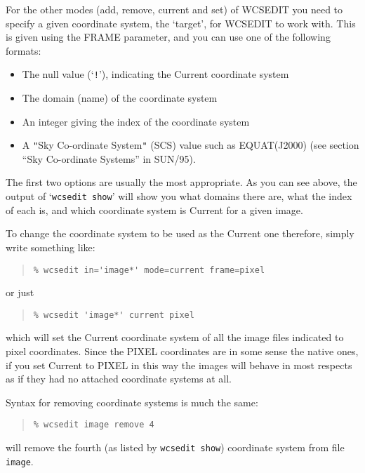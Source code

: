 \documentclass[twoside,11pt]{article}
\newcommand{\xref}[3]{#1}
\renewcommand{\_}{\texttt{\symbol{95}}}
\newenvironment{myquote}{\begin{quote}\begin{small}}{\end{small}\end{quote}}
\newcommand{\qt}[1]{{\tt "}#1{\tt "}}
\newcommand{\routine}[1]{{\sc #1}}
\begin{document}
For the other modes (add, remove, current and set) of \routine{WCSEDIT}
you need to specify a given coordinate system,
the `target', for \routine{WCSEDIT} to work with.
This is given using the FRAME parameter, and you can use one
of the following formats:
\begin{itemize}
\item
The null value (`{\tt !}'), indicating the Current coordinate system
\item
The domain (name) of the coordinate system
\item
An integer giving the index of the coordinate system
\item
A \qt{Sky Co-ordinate System} (SCS) value such as EQUAT(J2000)
(see section ``\xref{Sky Co-ordinate Systems}{sun95}{se_scs}'' in 
\xref{SUN/95}{sun95}{}).
\end{itemize}
The first two options are usually the most appropriate.
As you can see above, the output of `{\tt wcsedit show}' 
will show you what domains there are, what the index of each is, 
and which coordinate system is Current for a given image.

To change the coordinate system to be used as the Current one
therefore, simply write something like:
\begin{myquote}
\begin{verbatim}
% wcsedit in='image*' mode=current frame=pixel
\end{verbatim}
\end{myquote}
or just
\begin{myquote}
\begin{verbatim}
% wcsedit 'image*' current pixel
\end{verbatim}
\end{myquote}
which will set the Current coordinate system of all the image files
indicated to pixel coordinates.
Since the PIXEL coordinates are in some sense the native ones,
if you set Current to PIXEL in this way
the images will behave in most respects as if they had no attached
coordinate systems at all.

Syntax for removing coordinate systems is much the same:
\begin{myquote}
\begin{verbatim}
% wcsedit image remove 4
\end{verbatim}
\end{myquote}
will remove the fourth (as listed by {\tt wcsedit show}) coordinate
system from file {\tt image}.
\end{document}

